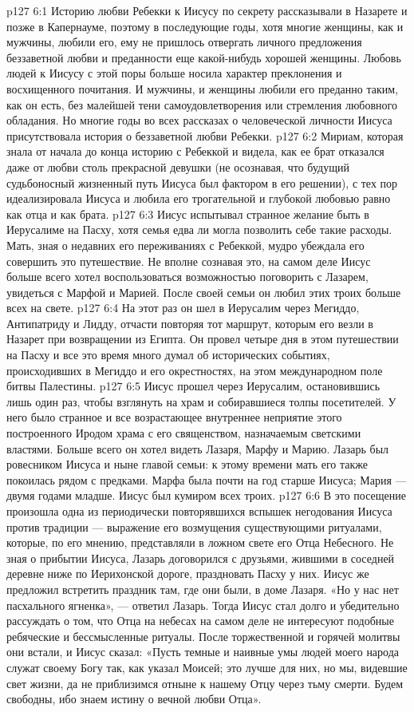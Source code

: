 \vs p127 6:1 Историю любви Ребекки к Иисусу по секрету рассказывали в Назарете и позже в Капернауме, поэтому в последующие годы, хотя многие женщины, как и мужчины, любили его, ему не пришлось отвергать личного предложения беззаветной любви и преданности еще какой\hyp{}нибудь хорошей женщины. Любовь людей к Иисусу с этой поры больше носила характер преклонения и восхищенного почитания. И мужчины, и женщины любили его преданно таким, как он есть, без малейшей тени самоудовлетворения или стремления любовного обладания. Но многие годы во всех рассказах о человеческой личности Иисуса присутствовала история о беззаветной любви Ребекки.
\vs p127 6:2 Мириам, которая знала от начала до конца историю с Ребеккой и видела, как ее брат отказался даже от любви столь прекрасной девушки (не осознавая, что будущий судьбоносный жизненный путь Иисуса был фактором в его решении), с тех пор идеализировала Иисуса и любила его трогательной и глубокой любовью равно как отца и как брата.
\vs p127 6:3 \pc Иисус испытывал странное желание быть в Иерусалиме на Пасху, хотя семья едва ли могла позволить себе такие расходы. Мать, зная о недавних его переживаниях с Ребеккой, мудро убеждала его совершить это путешествие. Не вполне сознавая это, на самом деле Иисус больше всего хотел воспользоваться возможностью поговорить с Лазарем, увидеться с Марфой и Марией. После своей семьи он любил этих троих больше всех на свете.
\vs p127 6:4 На этот раз он шел в Иерусалим через Мегиддо, Антипатриду и Лидду, отчасти повторяя тот маршрут, которым его везли в Назарет при возвращении из Египта. Он провел четыре дня в этом путешествии на Пасху и все это время много думал об исторических событиях, происходивших в Мегиддо и его окрестностях, на этом международном поле битвы Палестины.
\vs p127 6:5 Иисус прошел через Иерусалим, остановившись лишь один раз, чтобы взглянуть на храм и собиравшиеся толпы посетителей. У него было странное и все возрастающее внутреннее неприятие этого построенного Иродом храма с его священством, назначаемым светскими властями. Больше всего он хотел видеть Лазаря, Марфу и Марию. Лазарь был ровесником Иисуса и ныне главой семьи: к этому времени мать его также покоилась рядом с предками. Марфа была почти на год старше Иисуса; Мария --- двумя годами младше. Иисус был кумиром всех троих.
\vs p127 6:6 В это посещение произошла одна из периодически повторявшихся вспышек негодования Иисуса против традиции --- выражение его возмущения существующими ритуалами, которые, по его мнению, представляли в ложном свете его Отца Небесного. Не зная о прибытии Иисуса, Лазарь договорился с друзьями, жившими в соседней деревне ниже по Иерихонской дороге, праздновать Пасху у них. Иисус же предложил встретить праздник там, где они были, в доме Лазаря. «Но у нас нет пасхального ягненка», --- ответил Лазарь. Тогда Иисус стал долго и убедительно рассуждать о том, что Отца на небесах на самом деле не интересуют подобные ребяческие и бессмысленные ритуалы. После торжественной и горячей молитвы они встали, и Иисус сказал: «Пусть темные и наивные умы людей моего народа служат своему Богу так, как указал Моисей; это лучше для них, но мы, видевшие свет жизни, да не приблизимся отныне к нашему Отцу через тьму смерти. Будем свободны, ибо знаем истину о вечной любви Отца».

